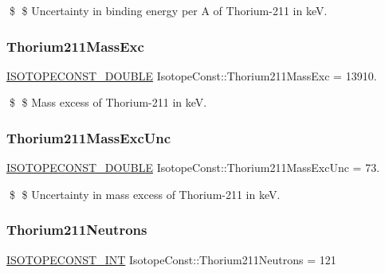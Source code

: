 \$ \$ Uncertainty in binding energy per A of Thorium-\/211 in keV. \mbox{\label{group___isotope_const-_thorium-_th211_ga2afe3014184f8b36f36249dd17d410e4}} 
\subsubsection{\texorpdfstring{Thorium211\+Mass\+Exc}{Thorium211MassExc}}
{\footnotesize\ttfamily \mbox{\hyperlink{group___isotope_const-_macros_ga8f45a7272ce02c0b4c65c44636ed719a}{I\+S\+O\+T\+O\+P\+E\+C\+O\+N\+S\+T\+\_\+\+D\+O\+U\+B\+LE}} Isotope\+Const\+::\+Thorium211\+Mass\+Exc = 13910.}

\$ \$ Mass excess of Thorium-\/211 in keV. \mbox{\label{group___isotope_const-_thorium-_th211_gab20157681b519292b8e6f9d0c318787a}} 
\subsubsection{\texorpdfstring{Thorium211\+Mass\+Exc\+Unc}{Thorium211MassExcUnc}}
{\footnotesize\ttfamily \mbox{\hyperlink{group___isotope_const-_macros_ga8f45a7272ce02c0b4c65c44636ed719a}{I\+S\+O\+T\+O\+P\+E\+C\+O\+N\+S\+T\+\_\+\+D\+O\+U\+B\+LE}} Isotope\+Const\+::\+Thorium211\+Mass\+Exc\+Unc = 73.}

\$ \$ Uncertainty in mass excess of Thorium-\/211 in keV. \mbox{\label{group___isotope_const-_thorium-_th211_ga25dd33841264998a99dd8358d8dfa6ec}} 
\subsubsection{\texorpdfstring{Thorium211\+Neutrons}{Thorium211Neutrons}}
{\footnotesize\ttfamily \mbox{\hyperlink{group___isotope_const-_macros_ga5f18360b3e99483a35c32d789e62621c}{I\+S\+O\+T\+O\+P\+E\+C\+O\+N\+S\+T\+\_\+\+I\+NT}} Isotope\+Const\+::\+Thorium211\+Neutrons = 121}

